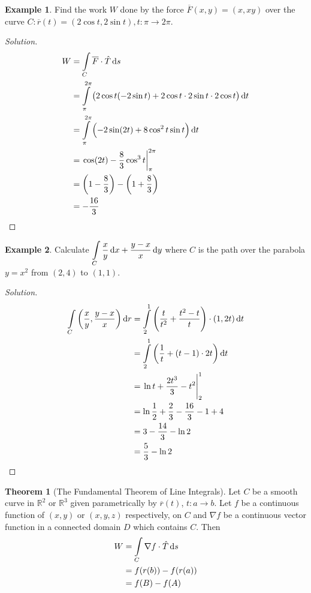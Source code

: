 \documentclass[fleqn, a4paper, 10pt]{article}
\theoremstyle{definition}
\newtheorem{example}{Example}
\theoremstyle{theorem}
\newtheorem{theorem}{Theorem}
\theoremstyle{remark}
\newenvironment{solution}
	{\begin{proof}[Solution]\let\qed\relax}
	{\end{proof}}
\begin{document}
\begin{multicols}{2}
\begin{example}
	Find the work $W$ done by the force $\overline{F}(x,y) = (x, xy)$ over the curve $C : \overline{r}(t) = (2 \cos t, 2 \sin t) , t : \pi \to 2 \pi$.
\end{example}

\begin{solution}
	\begin{align*}
		W &= \int\limits_{C} \overline{F} \cdot \hat{T} \dif s\\
		&= \int\limits_{\pi}^{2 \pi} \left( 2 \cos t (-2 \sin t) + 2 \cos t \cdot 2 \sin t \cdot 2 \cos t \right) \dif t\\
		&= \int\limits_{\pi}^{2 \pi} \left( - 2 \sin (2t) + 8 \cos^2 t \sin t \right) \dif t\\
		&= \left. \cos (2t) - \dfrac{8}{3} \cos^3 t \right\rvert_{\pi}^{2 \pi}\\
		&= \left( 1 - \dfrac{8}{3} \right) - \left( 1 + \dfrac{8}{3} \right)\\
		&= -\dfrac{16}{3}
	\end{align*}
\end{solution}

\begin{example}
	Calculate $\displaystyle \int\limits_{C} \dfrac{x}{y} \dif x + \dfrac{y - x}{x} \dif y$ where $C$ is the path over the parabola $y = x^2$ from $(2,4)$ to $(1,1)$.
\end{example}

\begin{solution}
	\begin{align*}
		\int\limits_{C} \left( \dfrac{x}{y}, \dfrac{y - x}{x} \right) \dif r &= \int\limits_{2}^{1} \left( \dfrac{t}{t^2} + \dfrac{t^2 - t}{t} \right) \cdot (1, 2t) \dif t\\
		&= \int\limits_{2}^{1} \left( \dfrac{1}{t} + (t - 1) \cdot 2t \right) \dif t\\
		&= \left. \ln t + \dfrac{2 t^3}{3} - t^2 \right|_{2}^{1}\\
		&= \ln \dfrac{1}{2} + \dfrac{2}{3} - \dfrac{16}{3} - 1 + 4\\
		&= 3 - \dfrac{14}{3} - \ln 2\\
		&= \dfrac{5}{3} - \ln 2
	\end{align*}
\end{solution}

\begin{theorem}[The Fundamental Theorem of Line Integrals]\label{The Fundamental Theorem of Line Integrals}
	Let $C$ be a smooth curve in $\mathbb{R}^2$ or $\mathbb{R}^3$ given parametrically by $\overline{r}(t)$, $t : a \to b$. Let $f$ be a continuous function of $(x,y)$ or $(x,y,z)$ respectively, on $C$ and $\nabla f$ be a continuous vector function in a connected domain $D$ which contains $C$. Then
	\begin{align*}
		W &= \int\limits_{C} \nabla f \cdot \hat{T} \dif s\\
		&= f(r(b)) - f(r(a))\\
		&= f(B) - f(A)
	\end{align*}
\end{theorem}


\end{multicols}
\end{document}
